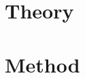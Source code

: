 \mainmatter

\chapter{Theory}
\label{cha:theory}


\vfill{}

\chapter{Method}
\label{cha:method}





